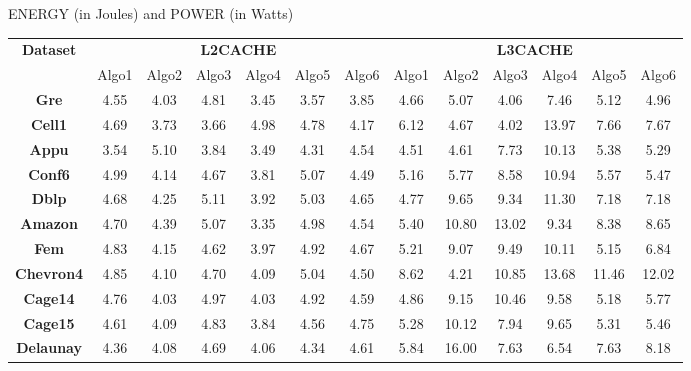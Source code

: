 \begin{table}[th]
\caption{\capfont ENERGY (in Joules) and POWER (in Watts) }
\label{tab:Table5}
\end{table}


\begin{table}[th]
\small
\centering

\begin{tabular}{ c|c|c|c|c|c|c|c|c|c|c|c|c| }
\hline
\multicolumn{1}{|c|}{\textbf{Dataset}} &
\multicolumn{6}{c}{\textbf{L2CACHE}} &
  \multicolumn{6}{|c|}{\textbf{L3CACHE}} \\
  \cline{2-13}
  \multicolumn{1}{|c|}{} &
  Algo1 & Algo2 & Algo3 & Algo4 & Algo5 & Algo6 & Algo1 & Algo2 & Algo3 & Algo4 & Algo5 & Algo6\\\hline
    \hline
  \multicolumn{1}{|c|}{\textbf{Gre}}
& 4.55 & 4.03 & 4.81 & \cellcolor{blue!25}3.45 & 3.57 & 3.85 & 4.66 & 5.07 & \cellcolor{green!25}4.06 & 7.46 & 5.12 & 4.96 \\ \hline
  \multicolumn{1}{|c|}{\textbf{Cell1}}
& 4.69 & 3.73 & \cellcolor{blue!25}3.66 & 4.98 & 4.78 & 4.17 & 6.12 & 4.67 & \cellcolor{green!25}4.02 & 13.97 & 7.66 & 7.67\\ \hline
  \multicolumn{1}{|c|}{\textbf{Appu}}
& 3.54 & 5.10 & 3.84 & \cellcolor{blue!25}3.49 & 4.31 & 4.54 & \cellcolor{green!25}4.51 & 4.61 & 7.73 & 10.13 & 5.38 & 5.29\\ \hline
\multicolumn{1}{|c|}{\textbf{Conf6}}
& 4.99 & 4.14 & 4.67 & \cellcolor{blue!25}3.81 & 5.07 & 4.49 & \cellcolor{green!25}5.16 & 5.77 & 8.58 & 10.94 & 5.57 & 5.47\\ \hline
  \multicolumn{1}{|c|}{\textbf{Dblp}}
& 4.68 & 4.25 & 5.11 & \cellcolor{blue!25}3.92 & 5.03 & 4.65 & \cellcolor{green!25}4.77 & 9.65 & 9.34 & 11.30 & 7.18 & 7.18\\ \hline
  \multicolumn{1}{|c|}{\textbf{Amazon}}
& 4.70 & 4.39 & 5.07 & \cellcolor{blue!25}3.35 & 4.98 & 4.54 & \cellcolor{green!25}5.40 & 10.80 & 13.02 & 9.34 & 8.38 & 8.65\\ \hline
  \multicolumn{1}{|c|}{\textbf{Fem}}
& 4.83 & 4.15 & 4.62 & \cellcolor{blue!25}3.97 & 4.92 & 4.67 & 5.21 & 9.07 & 9.49 & 10.11 & \cellcolor{green!25}5.15 & 6.84\\ \hline
  \multicolumn{1}{|c|}{\textbf{Chevron4}}
& 4.85 & 4.10 & 4.70 & \cellcolor{blue!25}4.09 & 5.04 & 4.50 & 8.62 & \cellcolor{green!25}4.21 & 10.85 & 13.68 & 11.46 & 12.02\\ \hline
  \multicolumn{1}{|c|}{\textbf{Cage14}}
& 4.76 & \cellcolor{blue!25}4.03 & 4.97 & 4.03 & 4.92 & 4.59 & \cellcolor{green!25}4.86 & 9.15 & 10.46 & 9.58 & 5.18 & 5.77\\ \hline
  \multicolumn{1}{|c|}{\textbf{Cage15}}
& 4.61 & 4.09 & 4.83 & \cellcolor{blue!25}3.84 & 4.56 & 4.75 & \cellcolor{green!25}5.28 & 10.12 & 7.94 & 9.65 & 5.31 & 5.46\\ \hline
  \multicolumn{1}{|c|}{\textbf{Delaunay}}
& 4.36 & 4.08 & 4.69 & \cellcolor{blue!25}4.06 & 4.34 & 4.61 & \cellcolor{green!25}5.84 & 16.00 & 7.63 & 6.54 & 7.63 & 8.18\\ \hline
\end{tabular}


\end{table}
